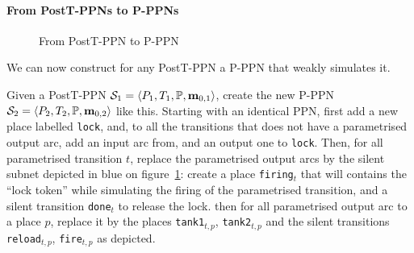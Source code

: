 
\paragraph{From PostT-PPNs to P-PPNs}

\begin{figure}[htbp]
  \centering
  
  \par
  \caption{From PostT-PPN to P-PPN}
  \label{fig:posttppn-to-pppn}
\end{figure}

We can now construct for any PostT-PPN a P-PPN that weakly simulates it.

Given a PostT-PPN $\namePPN[1] = \tuple{\places_1, \transitions_1, \parameters, \mar_{0,1}}$, create the new P-PPN $\namePPN[2] = \tuple{\places_2, \transitions_2, \parameters, \mar_{0,2}}$ like this.
Starting with an identical \ac{PPN}, first add a new place labelled \texttt{lock}, and, to all the transitions that does not have a parametrised output arc, add an input arc from, and an output one to \texttt{lock}.
Then, for all parametrised transition $t$, replace the parametrised output arcs by the silent subnet depicted in blue on figure~\ref{fig:posttppn-to-pppn}:
create a place \texttt{firing}$_t$ that will contains the ``lock token'' while simulating the firing of the parametrised transition, and a silent transition \texttt{done}$_t$ to release the lock.
then for all parametrised output arc to a place $p$, replace it by the places \texttt{tank1}$_{t,p}$, \texttt{tank2}$_{t,p}$ and the silent transitions \texttt{reload}$_{t,p}$, \texttt{fire}$_{t,p}$ as depicted.

